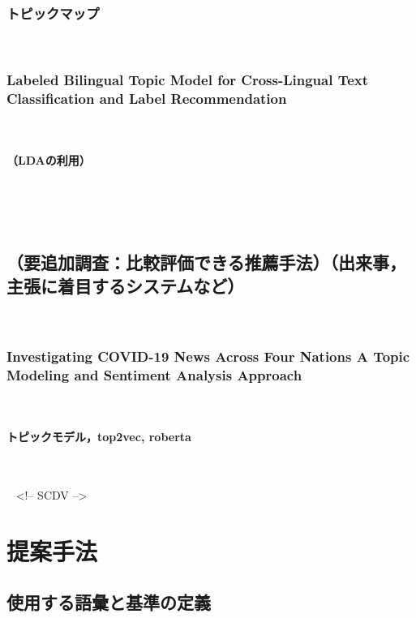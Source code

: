 \documentclass[12pt,a4j]{jreport}
\begin{document}
\subsection{トピックマップ}
~

\subsection{Labeled Bilingual Topic Model for Cross-Lingual Text Classification and Label Recommendation}
~

\subsubsection{（LDAの利用）}
~

~

\section{（要追加調査：比較評価できる推薦手法）（出来事，主張に着目するシステムなど）}
~

\subsection{Investigating COVID-19 News Across Four Nations A Topic Modeling and Sentiment Analysis Approach}
~

\subsubsection{トピックモデル，top2vec, roberta}
~

~%
 <!-- SCDV -->


\chapter{提案手法}


\section{使用する語彙と基準の定義}
~
\end{document}
